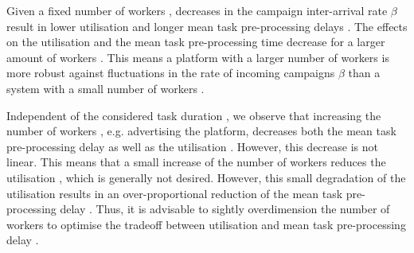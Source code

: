 Given a fixed number of workers \numberOfWorkers, decreases in the campaign inter-arrival rate \(\beta\) result in lower utilisation \workerUtilization and longer mean task pre-processing delays \preTaskProcessingDelay.
The effects on the utilisation \workerUtilization and the mean task pre-processing time \preTaskProcessingDelay decrease for a larger amount of workers \numberOfWorkers.
This means a platform with a larger number of workers is more robust against fluctuations in the rate of incoming campaigns \(\beta\) than a system with a small number of workers \numberOfWorkers.

Independent of the considered task duration \taskDuration, we observe that increasing the number of workers \numberOfWorkers, e.g. advertising the platform, decreases both the mean task pre-processing delay \preTaskProcessingDelay as well as the utilisation \workerUtilization.
However, this decrease is not linear.
This means that a small increase of the number of workers \numberOfWorkers reduces the utilisation \workerUtilization, which is generally not desired.
However, this small degradation of the utilisation \workerUtilization results in an over-proportional reduction of the mean task pre-processing delay \preTaskProcessingDelay.
Thus, it is advisable to sightly overdimension the number of workers \numberOfWorkers to optimise the tradeoff between utilisation \workerUtilization and mean task pre-processing delay \preTaskProcessingDelay.
